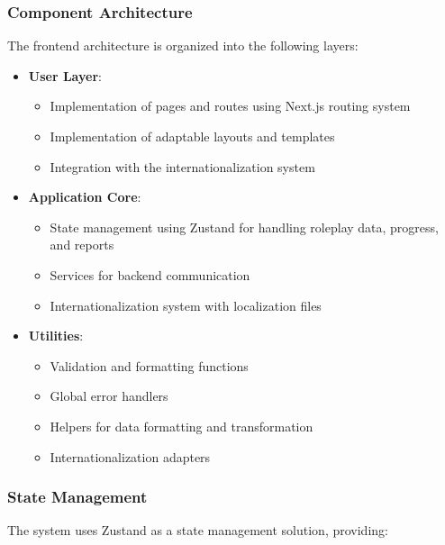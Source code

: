 \subsubsection{Component Architecture}
The frontend architecture is organized into the following layers:

\begin{itemize}
	\item \textbf{User Layer}:
	      \begin{itemize}
		      \item Implementation of pages and routes using Next.js routing system
		      \item Implementation of adaptable layouts and templates
		      \item Integration with the internationalization system
	      \end{itemize}

	\item \textbf{Application Core}:
	      \begin{itemize}
		      \item State management using Zustand for handling roleplay data, progress, and reports
		      \item Services for backend communication
		      \item Internationalization system with localization files
	      \end{itemize}

	\item \textbf{Utilities}:
	      \begin{itemize}
		      \item Validation and formatting functions
		      \item Global error handlers
		      \item Helpers for data formatting and transformation
		      \item Internationalization adapters
	      \end{itemize}
\end{itemize}

\subsubsection{State Management}
\label{gestion-estado}

The system uses Zustand as a state management solution, providing:

